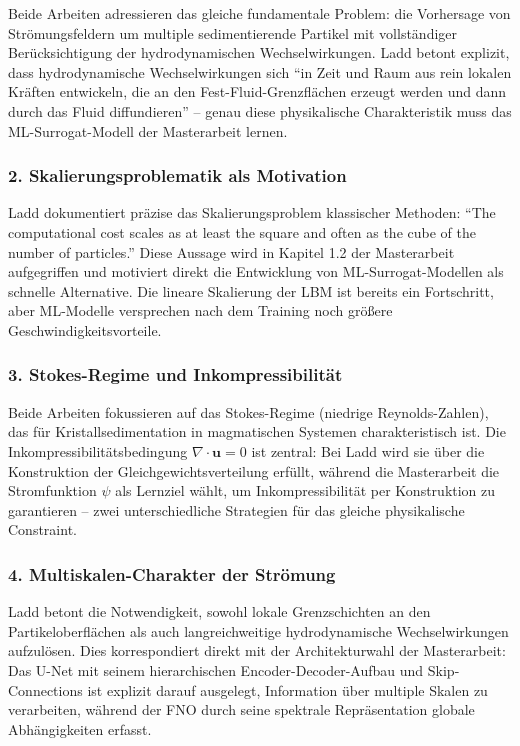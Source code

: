 \documentclass[a4paper,12pt]{article}
\begin{document}
Beide Arbeiten adressieren das gleiche fundamentale Problem: die Vorhersage von Str\"omungsfeldern um multiple sedimentierende Partikel mit vollst\"andiger Ber\"ucksichtigung der hydrodynamischen Wechselwirkungen. Ladd betont explizit, dass hydrodynamische Wechselwirkungen sich ``in Zeit und Raum aus rein lokalen Kr\"aften entwickeln, die an den Fest-Fluid-Grenzfl\"achen erzeugt werden und dann durch das Fluid diffundieren'' -- genau diese physikalische Charakteristik muss das ML-Surrogat-Modell der Masterarbeit lernen.

\subsubsection*{2. Skalierungsproblematik als Motivation}

Ladd dokumentiert pr\"azise das Skalierungsproblem klassischer Methoden: ``The computational cost scales as at least the square and often as the cube of the number of particles.'' Diese Aussage wird in Kapitel 1.2 der Masterarbeit aufgegriffen und motiviert direkt die Entwicklung von ML-Surrogat-Modellen als schnelle Alternative. Die lineare Skalierung der LBM ist bereits ein Fortschritt, aber ML-Modelle versprechen nach dem Training noch gr\"o{\ss}ere Geschwindigkeitsvorteile.

\subsubsection*{3. Stokes-Regime und Inkompressibilit\"at}

Beide Arbeiten fokussieren auf das Stokes-Regime (niedrige Reynolds-Zahlen), das f\"ur Kristallsedimentation in magmatischen Systemen charakteristisch ist. Die Inkompressibilit\"atsbedingung $\nabla \cdot \mathbf{u} = 0$ ist zentral: Bei Ladd wird sie \"uber die Konstruktion der Gleichgewichtsverteilung erf\"ullt, w\"ahrend die Masterarbeit die Stromfunktion $\psi$ als Lernziel w\"ahlt, um Inkompressibilit\"at per Konstruktion zu garantieren -- zwei unterschiedliche Strategien f\"ur das gleiche physikalische Constraint.

\subsubsection*{4. Multiskalen-Charakter der Str\"omung}

Ladd betont die Notwendigkeit, sowohl lokale Grenzschichten an den Partikeloberfl\"achen als auch langreichweitige hydrodynamische Wechselwirkungen aufzul\"osen. Dies korrespondiert direkt mit der Architekturwahl der Masterarbeit: Das U-Net mit seinem hierarchischen Encoder-Decoder-Aufbau und Skip-Connections ist explizit darauf ausgelegt, Information \"uber multiple Skalen zu verarbeiten, w\"ahrend der FNO durch seine spektrale Repr\"asentation globale Abh\"angigkeiten erfasst.
\end{document}

